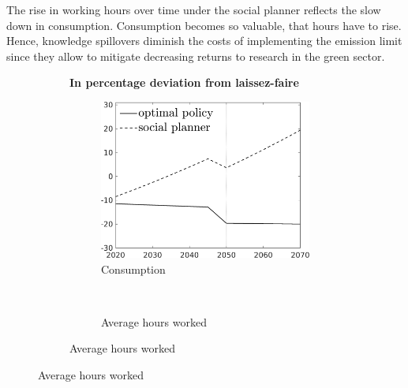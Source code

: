 The rise in working hours over time under the social planner reflects the slow down in consumption. Consumption becomes so valuable, that hours have to rise. 
Hence, knowledge spillovers diminish the costs of implementing the emission limit since they allow to mitigate decreasing returns to research in the green sector. 


\begin{figure}[h!!!]
	\centering 	\caption{Efficient and optimal allocation: no knowledge spillovers}\label{fig:optAll_percLf_dyn_noKN}
		\begin{subfigure}[]{1\textwidth}	
		\centering\footnotesize{\textbf{In percentage deviation from laissez-faire}}\\ \vspace{2mm}
		\begin{subfigure}[]{0.4\textwidth}
			\caption{Consumption}
			\includegraphics[width=1\textwidth]{../../codding_model/own_basedOnFried/optimalPol_010922_revision/figures/all_13Sept22_Tplus30/C_PercentageLFDyn_Target_regime4_knspil1_spillover0_noskill0_sep0_xgrowth0_PV1_etaa0.79_lgd1.png}
		\end{subfigure}
		\begin{minipage}[]{0.1\textwidth}
			\ 
		\end{minipage}
		\begin{subfigure}[]{0.4\textwidth}
			\caption{Average hours worked }

\end{subfigure}
\end{subfigure}
\end{figure}
